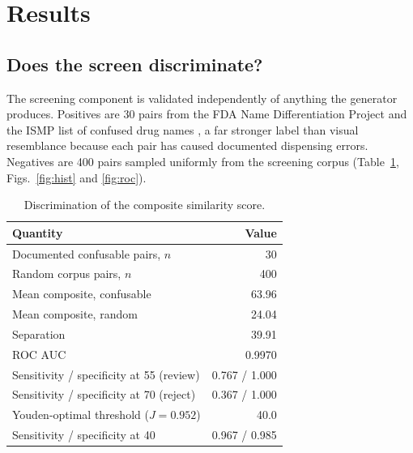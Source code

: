 \documentclass[conference]{IEEEtran}
\begin{document}
\section{Results}
\label{sec:results}

\subsection{Does the screen discriminate?}

The screening component is validated independently of anything the generator
produces. Positives are 30 pairs from the FDA Name Differentiation Project and
the ISMP list of confused drug names \cite{ismp}, a far stronger label than
visual resemblance because each pair has caused documented dispensing errors.
Negatives are 400 pairs sampled uniformly from the screening corpus
(Table~\ref{tab:disc}, Figs.~\ref{fig:hist} and \ref{fig:roc}).

\begin{table}[t]
\caption{Discrimination of the composite similarity score.}
\label{tab:disc}
\centering
\footnotesize
\begin{tabular}{lr}
\toprule
Quantity & Value \\
\midrule
Documented confusable pairs, $n$ & 30 \\
Random corpus pairs, $n$ & 400 \\
Mean composite, confusable & 63.96 \\
Mean composite, random & 24.04 \\
Separation & 39.91 \\
ROC AUC & 0.9970 \\
\midrule
Sensitivity / specificity at 55 (review) & 0.767 / 1.000 \\
Sensitivity / specificity at 70 (reject) & 0.367 / 1.000 \\
Youden-optimal threshold ($J = 0.952$) & 40.0 \\
Sensitivity / specificity at 40 & 0.967 / 0.985 \\
\bottomrule
\end{tabular}
\end{table}
\end{document}
